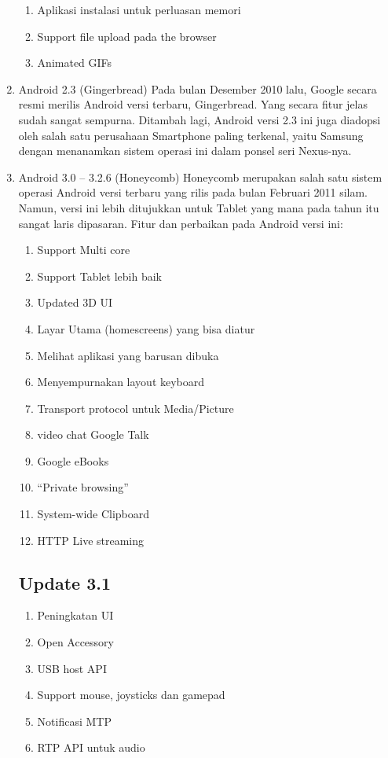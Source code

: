 \begin{enumerate}
\begin{enumerate}
\item Aplikasi instalasi untuk perluasan memori
\item Support file upload pada the browser
\item Animated GIFs
\end{enumerate}
\item Android 2.3 (Gingerbread)
Pada bulan Desember 2010 lalu, Google secara resmi merilis Android versi terbaru, Gingerbread. Yang secara fitur jelas sudah sangat sempurna. Ditambah lagi, Android versi 2.3 ini juga diadopsi oleh salah satu perusahaan Smartphone paling terkenal, yaitu Samsung dengan menanamkan sistem operasi ini dalam ponsel seri Nexus-nya.
\item Android 3.0 – 3.2.6 (Honeycomb)
Honeycomb merupakan salah satu sistem operasi Android versi terbaru yang rilis pada bulan Februari 2011 silam. Namun, versi ini lebih ditujukkan untuk Tablet yang mana pada tahun itu sangat laris dipasaran.
Fitur dan perbaikan pada Android versi ini:
\begin{enumerate}
\item Support Multi core
\item Support Tablet lebih baik
\item Updated 3D UI
\item Layar Utama (homescreens) yang bisa diatur
\item Melihat aplikasi yang barusan dibuka
\item Menyempurnakan layout keyboard
\item Transport protocol untuk Media/Picture
\item video chat Google Talk
\item Google eBooks
\item “Private browsing”
\item System-wide Clipboard
\item HTTP Live streaming
\end{enumerate}
\subsection{Update 3.1}
\begin{enumerate}
\item Peningkatan UI
\item Open Accessory 
\item USB host API
\item Support mouse, joysticks dan gamepad
\item Notificasi MTP
\item RTP API untuk audio
\end{enumerate}

\end{enumerate}
